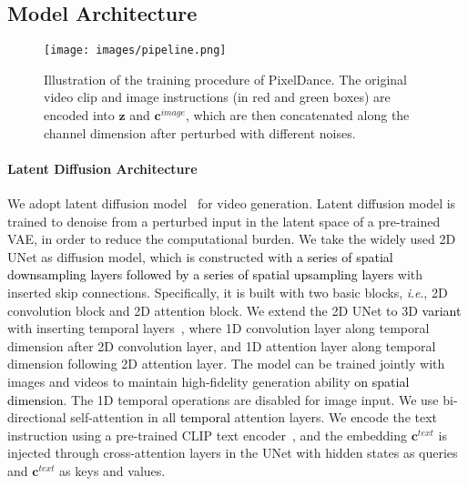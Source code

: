 \documentclass[10pt,twocolumn,letterpaper]{article}
\newcommand{\tcb}{\textcolor{black}}
\newcommand{\ieno}{\textit{i}.\textit{e}.}
\newcommand{\ours}{{PixelDance}}
\begin{document}
\subsection{Model Architecture}
\label{sec: condition vdm}


\begin{figure}[t]
  \centering
  \texttt{[image: images/pipeline.png]}
  \caption{
  Illustration of the training procedure of \ours. The original video clip and image instructions (in red and green boxes) are encoded into $\mathbf{z}$ and $\mathbf{c}^{image}$, which are then concatenated along the channel dimension after perturbed with different noises. 
}
  \label{fig: model}
\end{figure}

\paragraph{Latent Diffusion Architecture} We adopt latent diffusion model~\cite{rombach2022high} for video generation. Latent diffusion model is trained to denoise from a perturbed input in the latent space of a pre-trained VAE, in order to reduce the computational burden. We take the widely used 2D UNet \cite{ronneberger2015u} as diffusion model, which is constructed with \tcb{a series of spatial downsampling layers followed by a series of spatial upsampling layers} with inserted skip connections. Specifically, it is built with two basic blocks, \ieno, 2D convolution block and 2D attention block. We extend the 2D UNet to 3D \tcb{variant} with inserting temporal layers~\cite{VDM}, where 1D convolution layer along temporal dimension after 2D convolution layer, and 1D attention layer along temporal dimension following 2D attention layer. The model can be trained jointly with images and videos to maintain high-fidelity generation ability \tcb{on spatial dimension}. The 1D temporal operations are disabled for image input. We use bi-directional self-attention in all \tcb{temporal} attention layers. We encode the text instruction using a pre-trained CLIP text encoder~\cite{radford2021CLIP}, and the embedding $\mathbf{c}^{text}$ is injected through cross-attention layers in the UNet with hidden states as queries and $\mathbf{c}^{text}$ as keys and values.
\end{document}
